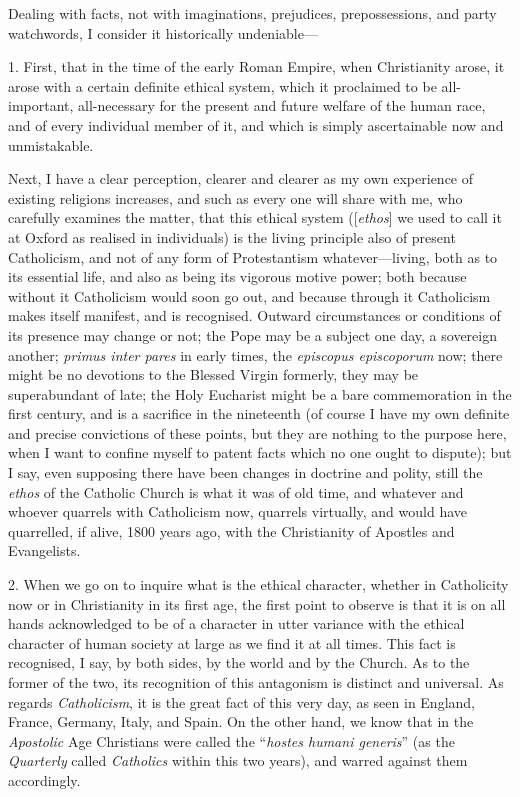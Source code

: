 Dealing with facts, not with imaginations,
prejudices, prepossessions, and party watchwords, I consider it
historically undeniable—

1. First, that in the time of the early Roman
Empire, when Christianity arose, it arose with a certain definite
ethical system, which it proclaimed to be all-important, all-necessary
for the present and future welfare of the human race, and of every
individual member of it, and which is simply ascertainable now and
unmistakable.

Next, I have a clear perception, clearer and
clearer as my own experience of existing religions increases, and such
as every one will share with me, who carefully examines the matter,
that this ethical system ([\emph{ethos}] we used to call it at Oxford
as realised in individuals) is the living principle also of present
Catholicism, and not of any form of Protestantism whatever—living,
both as to its essential life, and also as being its vigorous motive
power; both because without it Catholicism would soon go out, and
because through it Catholicism makes itself manifest, and is
recognised. Outward circumstances or conditions of its presence may
change or not; the Pope may be a subject one day, a sovereign another;
\emph{primus inter pares} in early times, the \emph{episcopus
episcoporum} now; there might be no devotions to the Blessed Virgin
formerly, they may be superabundant of late; the Holy Eucharist might
be a bare commemoration in the first century, and is a sacrifice in
the nineteenth (of course I have my own definite and precise
convictions of these points, but they are nothing to the purpose here,
when I want to confine myself to patent facts which no one ought to
dispute); but I say, even supposing there have been changes in
doctrine and polity, still the \emph{ethos} of the Catholic Church is
what it was of old time, and whatever and whoever quarrels with
Catholicism now, quarrels virtually, and would have quarrelled, if
alive, 1800 years ago, with the Christianity of Apostles and
Evangelists.

2. When we go on to inquire what is the ethical
character, whether in Catholicity now or in Christianity in its first
age, the first point to observe is that it is on all hands
acknowledged to be of a character in utter variance with the ethical
character of human society at large as we find it at all times. This
fact is recognised, I say, by both sides, by the world and by the
Church. As to the former of the two, its recognition of this
antagonism is distinct and universal. As regards \emph{Catholicism},
it is the great fact of this very day, as seen in England, France,
Germany, Italy, and Spain. On the other hand, we know that in the \emph{Apostolic}
Age Christians were called the ``\emph{hostes humani generis}'' (as the \emph{Quarterly}
called \emph{Catholics} within this two years), and warred against
them accordingly.

